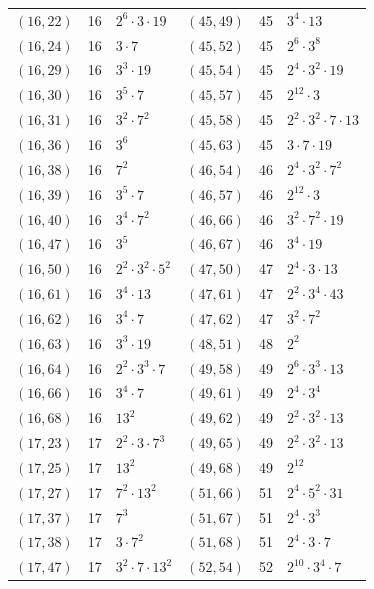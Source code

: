 \documentclass[11pt]{article}
\begin{document}
\begin{longtable}{@{}lrl@{\qquad}lrl@{}}
$(16,22)$ & 16 & $2^{6}\cdot 3\cdot 19$ & $(45,49)$ & 45 & $3^{4}\cdot 13$\\
$(16,24)$ & 16 & $3\cdot 7$ & $(45,52)$ & 45 & $2^{6}\cdot 3^{8}$\\
$(16,29)$ & 16 & $3^{3}\cdot 19$ & $(45,54)$ & 45 & $2^{4}\cdot 3^{2}\cdot 19$\\
$(16,30)$ & 16 & $3^{5}\cdot 7$ & $(45,57)$ & 45 & $2^{12}\cdot 3$\\
$(16,31)$ & 16 & $3^{2}\cdot 7^{2}$ & $(45,58)$ & 45 & $2^{2}\cdot 3^{2}\cdot 7\cdot 13$\\
$(16,36)$ & 16 & $3^{6}$ & $(45,63)$ & 45 & $3\cdot 7\cdot 19$\\
$(16,38)$ & 16 & $7^{2}$ & $(46,54)$ & 46 & $2^{4}\cdot 3^{2}\cdot 7^{2}$\\
$(16,39)$ & 16 & $3^{5}\cdot 7$ & $(46,57)$ & 46 & $2^{12}\cdot 3$\\
$(16,40)$ & 16 & $3^{4}\cdot 7^{2}$ & $(46,66)$ & 46 & $3^{2}\cdot 7^{2}\cdot 19$\\
$(16,47)$ & 16 & $3^{5}$ & $(46,67)$ & 46 & $3^{4}\cdot 19$\\
$(16,50)$ & 16 & $2^{2}\cdot 3^{2}\cdot 5^{2}$ & $(47,50)$ & 47 & $2^{4}\cdot 3\cdot 13$\\
$(16,61)$ & 16 & $3^{4}\cdot 13$ & $(47,61)$ & 47 & $2^{2}\cdot 3^{4}\cdot 43$\\
$(16,62)$ & 16 & $3^{4}\cdot 7$ & $(47,62)$ & 47 & $3^{2}\cdot 7^{2}$\\
$(16,63)$ & 16 & $3^{3}\cdot 19$ & $(48,51)$ & 48 & $2^{2}$\\
$(16,64)$ & 16 & $2^{2}\cdot 3^{3}\cdot 7$ & $(49,58)$ & 49 & $2^{6}\cdot 3^{3}\cdot 13$\\
$(16,66)$ & 16 & $3^{4}\cdot 7$ & $(49,61)$ & 49 & $2^{4}\cdot 3^{4}$\\
$(16,68)$ & 16 & $13^{2}$ & $(49,62)$ & 49 & $2^{2}\cdot 3^{2}\cdot 13$\\
$(17,23)$ & 17 & $2^{2}\cdot 3\cdot 7^{3}$ & $(49,65)$ & 49 & $2^{2}\cdot 3^{2}\cdot 13$\\
$(17,25)$ & 17 & $13^{2}$ & $(49,68)$ & 49 & $2^{12}$\\
$(17,27)$ & 17 & $7^{2}\cdot 13^{2}$ & $(51,66)$ & 51 & $2^{4}\cdot 5^{2}\cdot 31$\\
$(17,37)$ & 17 & $7^{3}$ & $(51,67)$ & 51 & $2^{4}\cdot 3^{3}$\\
$(17,38)$ & 17 & $3\cdot 7^{2}$ & $(51,68)$ & 51 & $2^{4}\cdot 3\cdot 7$\\
$(17,47)$ & 17 & $3^{2}\cdot 7\cdot 13^{2}$ & $(52,54)$ & 52 & $2^{10}\cdot 3^{4}\cdot 7$\\

\end{longtable}
\end{document}
